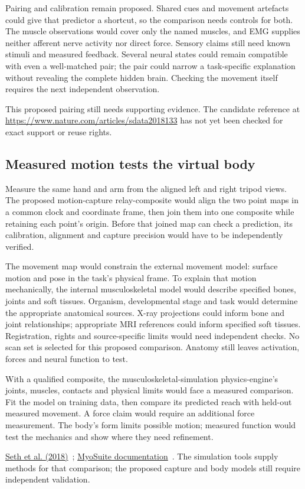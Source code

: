 Pairing and calibration remain proposed. Shared cues and movement artefacts
could give that predictor a shortcut, so the comparison needs controls for
both. The muscle observations would cover only the named muscles, and EMG
supplies neither afferent nerve activity nor direct force. Sensory claims
still need known stimuli and measured feedback. Several neural states could
remain compatible with even a well-matched pair; the pair could narrow a
task-specific explanation without revealing the complete hidden brain.
Checking the movement itself requires the next independent observation.
\par\noindent This proposed pairing still needs supporting evidence. The candidate reference at \url{https://www.nature.com/articles/sdata2018133} has not yet been checked for exact support or reuse rights.

\subsection{Measured motion tests the virtual body}
Measure the same hand and arm from the aligned left and right tripod views.
The proposed motion-capture relay-composite would align the two point maps
in a common clock and coordinate frame, then join them into one composite
while retaining each point's origin. Before that joined map can check a
prediction, its calibration, alignment and capture precision would have to
be independently verified.

The movement map would constrain the external movement model: surface motion
and pose in the task's physical frame. To explain that motion mechanically,
the internal musculoskeletal model would describe specified bones, joints
and soft tissues. Organism, developmental stage and task would determine the
appropriate anatomical sources. X-ray projections could inform bone and
joint relationships; appropriate MRI references could inform specified soft
tissues. Registration, rights and source-specific limits would need independent
checks. No scan set is selected for this proposed comparison. Anatomy still
leaves activation, forces and neural function to test.

With a qualified composite, the musculoskeletal-simulation physics-engine's
joints, muscles, contacts and physical limits would face a measured comparison.
Fit the model on training data, then compare its predicted reach with
held-out measured movement. A force claim would require an additional force
measurement. The body's form limits possible motion; measured function would
test the mechanics and show where they need refinement.
\par\noindent \href{https://journals.plos.org/ploscompbiol/article?id=10.1371/journal.pcbi.1006223}{Seth et al. (2018)}~\cite{opensim2018}; \href{https://myosuite.readthedocs.io/en/latest/}{MyoSuite documentation}~\cite{myosuiteDocsUndated}. The simulation tools supply methods for that comparison; the proposed capture and body models still require independent validation.

